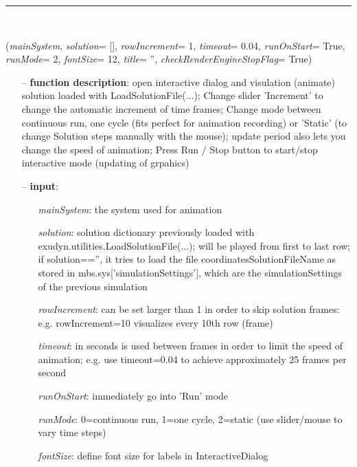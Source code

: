 \begin{itemize}[leftmargin=1.4cm]
\begin{itemize}[leftmargin=1.4cm]
\begin{itemize}[leftmargin=0.5cm]
\begin{itemize}[leftmargin=1.4cm]
\begin{itemize}[leftmargin=1.4cm]
\begin{itemize}[leftmargin=0.5cm]
\begin{itemize}[leftmargin=1.4cm]
\begin{itemize}[leftmargin=0.5cm]
\begin{itemize}[leftmargin=1.4cm]
\begin{itemize}[leftmargin=1.4cm]
%
\noindent\rule{8cm}{0.75pt}\vspace{1pt} \\ 
\begin{flushleft}
\label{sec:interactive:SolutionViewer}
({\it mainSystem}, {\it solution}= [], {\it rowIncrement}= 1, {\it timeout}= 0.04, {\it runOnStart}= True, {\it runMode}= 2, {\it fontSize}= 12, {\it title}= '', {\it checkRenderEngineStopFlag}= True)
\end{flushleft}
\setlength{\itemindent}{0.7cm}
\begin{itemize}[leftmargin=0.7cm]
\item[--]
{\bf function description}: open interactive dialog and visulation (animate) solution loaded with LoadSolutionFile(...); Change slider 'Increment' to change the automatic increment of time frames; Change mode between continuous run, one cycle (fits perfect for animation recording) or 'Static' (to change Solution steps manually with the mouse); update period also lets you change the speed of animation; Press Run / Stop button to start/stop interactive mode (updating of grpahics)
\item[--]
{\bf input}: \vspace{-6pt}
\begin{itemize}[leftmargin=1.2cm]
\setlength{\itemindent}{-0.7cm}
\item[]{\it mainSystem}: the system used for animation
\item[]{\it solution}: solution dictionary previously loaded with exudyn.utilities.LoadSolutionFile(...); will be played from first to last row; if solution=='', it tries to load the file coordinatesSolutionFileName as stored in mbs.sys['simulationSettings'], which are the simulationSettings of the previous simulation
\item[]{\it rowIncrement}: can be set larger than 1 in order to skip solution frames: e.g. rowIncrement=10 visualizes every 10th row (frame)
\item[]{\it timeout}: in seconds is used between frames in order to limit the speed of animation; e.g. use timeout=0.04 to achieve approximately 25 frames per second
\item[]{\it runOnStart}: immediately go into 'Run' mode
\item[]{\it runMode}: 0=continuous run, 1=one cycle, 2=static (use slider/mouse to vary time steps)
\item[]{\it fontSize}: define font size for labels in InteractiveDialog

\end{itemize}
\end{itemize}
\end{itemize}
\end{itemize}
\end{itemize}
\end{itemize}
\end{itemize}
\end{itemize}
\end{itemize}
\end{itemize}
\end{itemize}
\end{itemize}
